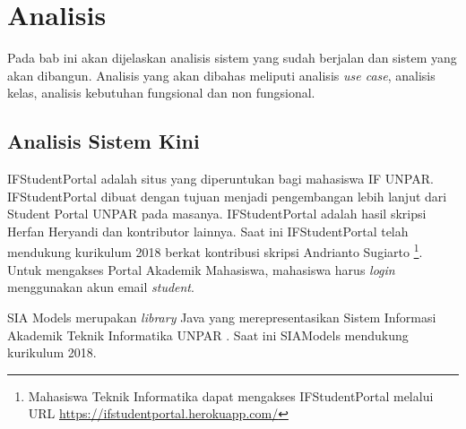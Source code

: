 \chapter{Analisis}
\label{chap:analisis}

Pada bab ini akan dijelaskan analisis sistem yang sudah berjalan dan sistem yang akan dibangun. Analisis yang akan dibahas meliputi analisis \textit{use case}, analisis kelas, analisis kebutuhan fungsional dan non fungsional.

\section{Analisis Sistem Kini}
% 

IFStudentPortal adalah situs yang diperuntukan bagi mahasiswa IF UNPAR\cite{ifstudentportalunpar}. IFStudentPortal dibuat dengan tujuan menjadi pengembangan lebih lanjut dari Student Portal UNPAR pada masanya. IFStudentPortal adalah hasil skripsi Herfan Heryandi \cite{herfan:15:portal} dan kontributor lainnya. Saat ini IFStudentPortal telah mendukung kurikulum 2018 berkat kontribusi skripsi Andrianto Sugiarto \cite{andrianto:18:portalsiam}\footnote{Mahasiswa Teknik Informatika dapat mengakses IFStudentPortal melalui URL \url{https://ifstudentportal.herokuapp.com/}}. Untuk mengakses Portal Akademik Mahasiswa, mahasiswa harus \textit{login} menggunakan akun email \textit{student}. 

SIA Models merupakan \textit{library} Java yang merepresentasikan Sistem Informasi Akademik Teknik Informatika UNPAR \cite{siamodels}. Saat ini SIAModels mendukung kurikulum 2018. 

